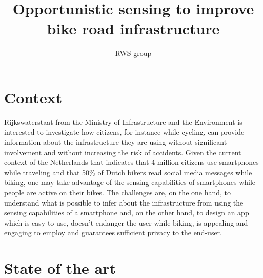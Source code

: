 \documentclass[preprint,12pt]{elsarticle}
\theoremstyle{definition}
\begin{document}
\begin{frontmatter}

\title{Opportunistic sensing to improve bike road infrastructure}

\author{RWS group}













\end{frontmatter}


\section{Context}
Rijkswaterstaat from the Ministry of Infrastructure and the
Environment is interested to investigate how citizens, for instance
while cycling, can provide information about the infrastructure they
are using without significant involvement and without increasing the
risk of accidents. Given the current context of the Netherlands that
indicates that 4 million citizens use smartphones while traveling and
that 50\% of Dutch bikers read social media messages while biking, one
may take advantage of the sensing capabilities of smartphones while
people are active on their bikes. The challenges are, on the one hand, to understand
what is possible to infer about the infrastructure from using the
sensing capabilities of a smartphone and, on the other hand, to design
an app which is easy to use, doesn't endanger the user while biking,
is appealing and engaging to employ and guarantees sufficient privacy
to the end-user. 


\section{State of the art}
\end{document}
